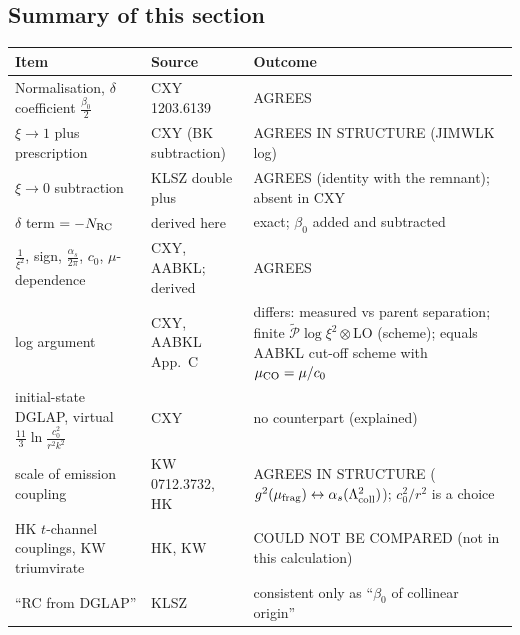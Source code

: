 \subsection{Summary of this section}
\begin{center}
\begin{tabular}{|p{5.2cm}|p{4.6cm}|p{7.2cm}|}\hline
Item & Source & Outcome\\\hline
Normalisation, $\delta$ coefficient $\frac{\beta_{0}}{2}$ & CXY 1203.6139 & AGREES\\
$\xi\to1$ plus prescription & CXY (BK subtraction) & AGREES IN STRUCTURE (JIMWLK log)\\
$\xi\to0$ subtraction & KLSZ double plus & AGREES (identity with the remnant); absent in CXY\\
$\delta$ term $=-N_{\rm RC}$ & derived here & exact; $\beta_{0}$ added and subtracted\\
$\frac{1}{\xi^{2}}$, sign, $\frac{\alpha_{s}}{2\pi}$, $c_{0}$, $\mu$-dependence & CXY, AABKL; derived & AGREES\\
log argument & CXY, AABKL App.~C & differs: measured vs parent separation; finite $\widetilde{\mathcal P}\log\xi^{2}\otimes$LO (scheme); equals AABKL cut-off scheme with $\mu_{\rm CO}=\mu/c_{0}$\\
initial-state DGLAP, virtual $\frac{11}{3}\ln\frac{c_{0}^{2}}{r^{2}k^{2}}$ & CXY & no counterpart (explained)\\
scale of emission coupling & KW 0712.3732, HK & AGREES IN STRUCTURE ($g^{2}(\mu_{\rm frag})\leftrightarrow\alpha_{s}(\Lambda^{2}_{\rm coll})$); $c_{0}^{2}/r^{2}$ is a choice\\
HK $t$-channel couplings, KW triumvirate & HK, KW & COULD NOT BE COMPARED (not in this calculation)\\
``RC from DGLAP'' & KLSZ & consistent only as ``$\beta_{0}$ of collinear origin''\\\hline
\end{tabular}
\end{center}
